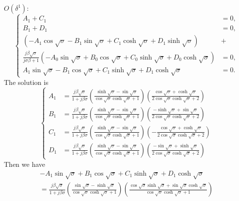 \documentclass{svjour3}                     %
\begin{document}
\noindent
$O(\delta^1)$:
\begin{equation}
    \left\{\begin{aligned}
        A_1 + C_1 &= 0, \\
        B_1 + D_1 &= 0, \\
        \left( - A_1 \cos{\sqrt{\sigma}} - B_1 \sin{\sqrt{\sigma}} + C_1 \cosh{\sqrt{\sigma}} + D_1 \sinh{\sqrt{\sigma}} \right) &+ \\
        \frac{j \beta \sqrt{\sigma}}{ j\sigma \beta + 1 } \left( - A_0 \sin{\sqrt{\sigma}} + B_0 \cos{\sqrt{\sigma}} + C_0 \sinh{\sqrt{\sigma}} + D_0 \cosh{\sqrt{\sigma}} \right) &= 0, \\
        A_1 \sin{\sqrt{\sigma}} - B_1 \cos{\sqrt{\sigma}} + C_1 \sinh{\sqrt{\sigma}} + D_1 \cosh{\sqrt{\sigma}} &= 0.
    \end{aligned}\right.
\end{equation}
The solution is
\begin{equation}
    \left\{\begin{aligned}
        A_1 &= \frac{j \beta  \sqrt{\sigma }}{1+j \beta  \sigma } \left( \frac{\sinh\sqrt{\sigma }-\sin\sqrt{\sigma }}{\cos\sqrt{\sigma } \cosh\sqrt{\sigma }+1} \right) \left(\frac{\cos\sqrt{\sigma }+\cosh\sqrt{\sigma }}{2 \cos\sqrt{\sigma }\cosh\sqrt{\sigma }+2} \right) \\
        B_1 &= \frac{j \beta  \sqrt{\sigma }}{1+j \beta  \sigma } \left( \frac{\sinh\sqrt{\sigma }-\sin\sqrt{\sigma }}{\cos\sqrt{\sigma } \cosh\sqrt{\sigma }+1} \right) \left( \frac{-\sinh\sqrt{\sigma }+\sin\sqrt{\sigma }}{2 \cos\sqrt{\sigma }\cosh\sqrt{\sigma }+2} \right)\\
        C_1 &= \frac{j \beta  \sqrt{\sigma }}{1+j \beta  \sigma } \left( \frac{\sinh\sqrt{\sigma }-\sin\sqrt{\sigma }}{\cos\sqrt{\sigma } \cosh\sqrt{\sigma }+1} \right) \left( -\frac{\cos\sqrt{\sigma }+\cosh\sqrt{\sigma }}{2 \cos\sqrt{\sigma } \cosh\sqrt{\sigma }+2} \right)\\
        D_1 &= \frac{j \beta  \sqrt{\sigma }}{1+j \beta  \sigma } \left( \frac{\sinh\sqrt{\sigma }-\sin\sqrt{\sigma }}{\cos\sqrt{\sigma } \cosh\sqrt{\sigma }+1} \right) \left( \frac{-\sin\sqrt{\sigma }+\sinh\sqrt{\sigma }}{2 \cos\sqrt{\sigma }\cosh\sqrt{\sigma }+2} \right)
    \end{aligned}\right.
\end{equation}
Then we have
\begin{equation}
    \begin{aligned}
        - A_1 \sin{\sqrt{\sigma}} + B_1 \cos{\sqrt{\sigma}} + C_1 \sinh{\sqrt{\sigma}} + D_1 \cosh{\sqrt{\sigma}} \\
        = \frac{j \beta  \sqrt{\sigma }}{1+j \beta  \sigma } \left(\frac{\sin\sqrt{\sigma } -\sinh\sqrt{\sigma }}{\cos\sqrt{\sigma } \cosh\sqrt{\sigma }+1} \right)  \left( \frac{\cos\sqrt{\sigma } \sinh\sqrt{\sigma }+\sin\sqrt{\sigma } \cosh\sqrt{\sigma }}{\cos\sqrt{\sigma } \cosh\sqrt{\sigma }+1} \right)
    \end{aligned}
\end{equation}
\end{document}
